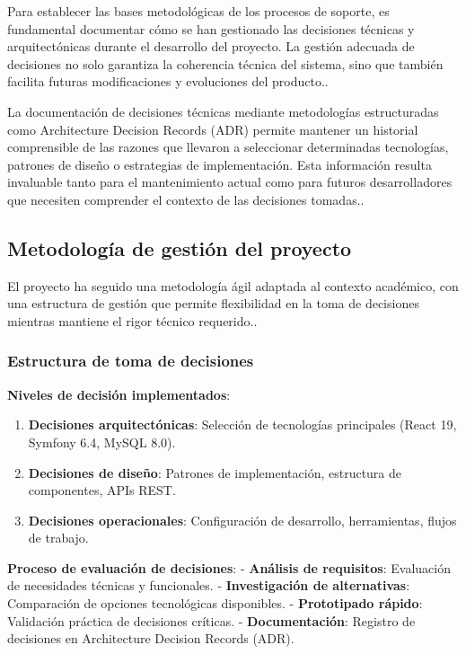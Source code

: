 \documentclass[12pt,a4paper,oneside]{report}
\providecommand{\tightlist}{%
  \setlength{\itemsep}{0pt}\setlength{\parskip}{0pt}}
\begin{document}
Para establecer las bases metodológicas de los procesos de soporte, es
fundamental documentar cómo se han gestionado las decisiones técnicas y
arquitectónicas durante el desarrollo del proyecto. La gestión adecuada
de decisiones no solo garantiza la coherencia técnica del sistema, sino
que también facilita futuras modificaciones y evoluciones del producto..

La documentación de decisiones técnicas mediante metodologías
estructuradas como Architecture Decision Records (ADR) permite mantener
un historial comprensible de las razones que llevaron a seleccionar
determinadas tecnologías, patrones de diseño o estrategias de
implementación. Esta información resulta invaluable tanto para el
mantenimiento actual como para futuros desarrolladores que necesiten
comprender el contexto de las decisiones tomadas..

\subsection{Metodología de gestión del
proyecto}\label{metodologuxeda-de-gestiuxf3n-del-proyecto}

El proyecto ha seguido una metodología ágil adaptada al contexto
académico, con una estructura de gestión que permite flexibilidad en la
toma de decisiones mientras mantiene el rigor técnico requerido..

\subsubsection{Estructura de toma de
decisiones}\label{estructura-de-toma-de-decisiones}

\textbf{Niveles de decisión implementados}:

\begin{enumerate}
\def\labelenumi{\arabic{enumi}.}
\tightlist
\item
  \textbf{Decisiones arquitectónicas}: Selección de tecnologías
  principales (React 19, Symfony 6.4, MySQL 8.0).
\item
  \textbf{Decisiones de diseño}: Patrones de implementación, estructura
  de componentes, APIs REST.
\item
  \textbf{Decisiones operacionales}: Configuración de desarrollo,
  herramientas, flujos de trabajo.
\end{enumerate}

\textbf{Proceso de evaluación de decisiones}: - \textbf{Análisis de
requisitos}: Evaluación de necesidades técnicas y funcionales. -
\textbf{Investigación de alternativas}: Comparación de opciones
tecnológicas disponibles. - \textbf{Prototipado rápido}: Validación
práctica de decisiones críticas. - \textbf{Documentación}: Registro de
decisiones en Architecture Decision Records (ADR).
\end{document}
